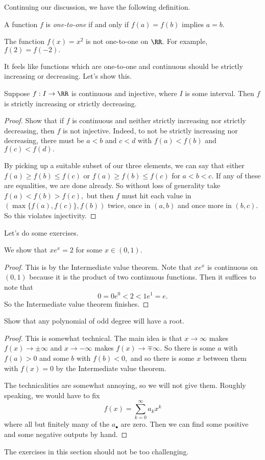 Continuing our discussion, we have the following definition.
\begin{definition}
	A function $f$ is \textit{one-to-one} if and only if $f(a)=f(b)$ implies $a=b.$
\end{definition}
\begin{nex}
	The function $f(x)=x^2$ is not one-to-one on $\RR.$ For example, $f(2)=f(-2).$
\end{nex}
It feels like functions which are one-to-one and continuous should be strictly increasing or decreasing. Let's show this.
\begin{proposition}
	Suppose $f:I\to\RR$ is continuous and injective, where $I$ is some interval. Then $f$ is strictly increasing or strictly decreasing.
\end{proposition}
\begin{proof}
	Show that if $f$ is continuous and neither strictly increasing nor strictly decreasing, then $f$ is not injective. Indeed, to not be strictly increasing nor decreasing, there must be $a<b$ and $c<d$ with $f(a)<f(b)$ and $f(c)<f(d).$
	
	By picking up a suitable subset of our three elements, we can say that either $f(a)\ge f(b)\le f(c)$ or $f(a)\ge f(b)\le f(c)$ for $a<b<c.$ If any of these are equalities, we are done already. So without loss of generality take $f(a)<f(b)>f(c),$ but then $f$ must hit each value in $(\max\{f(a),f(c)\},f(b))$ twice, once in $(a,b)$ and once more in $(b,c).$ So this violates injectivity.
\end{proof}
Let's do some exercises.
\begin{exercise}
	We show that $xe^x=2$ for some $x\in(0,1).$
\end{exercise}
\begin{proof}
	This is by the Intermediate value theorem. Note that $xe^x$ is continuous on $(0,1)$ because it is the product of two continuous functions. Then it suffices to note that
	\[0=0e^0<2<1e^1=e.\]
	So the Intermediate value theorem finishes.
\end{proof}
\begin{exercise}
	Show that any polynomial of odd degree will have a root.
\end{exercise}
\begin{proof}
	This is somewhat technical. The main idea is that $x\to\infty$ makes $f(x)\to\pm\infty$ and $x\to-\infty$ makes $f(x)\to\mp\infty.$ So there is some $a$ with $f(a)>0$ and some $b$ with $f(b)<0,$ and so there is some $x$ between them with $f(x)=0$ by the Intermediate value theorem.

	The technicalities are somewhat annoying, so we will not give them. Roughly speaking, we would have to fix
	\[f(x)=\sum_{k=0}^\infty a_kx^k\]
	where all but finitely many of the $a_\bullet$ are zero. Then we can find some positive and some negative outputs by hand.
\end{proof}
The exercises in this section should not be too challenging.

